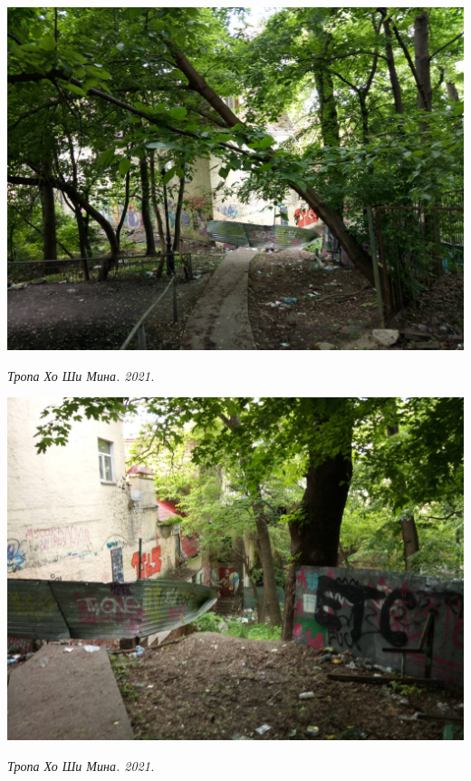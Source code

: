 \begin{center}
\includegraphics[width=\linewidth]{rpix/IMG_20210601_134915.jpg}

\textit{Тропа Хо Ши Мина. 2021.}
\end{center}



\begin{center}
\includegraphics[width=\linewidth]{rpix/IMG_20210601_134927.jpg}

\textit{Тропа Хо Ши Мина. 2021.}
\end{center}



